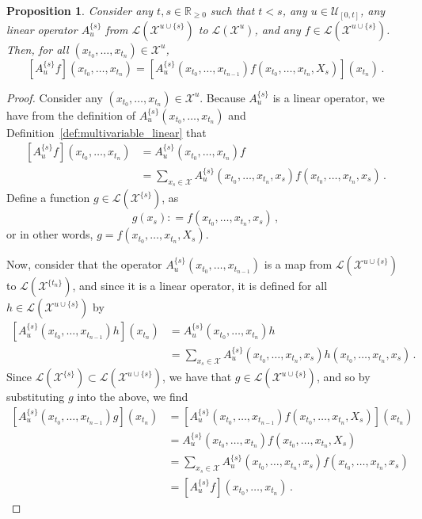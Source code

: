 \documentclass[10pt]{paper}
\newtheorem{proposition}[theorem]{Proposition}
\newcommand{\reals}{\mathbb{R}}
\newcommand{\realsnonneg}{\reals_{\geq 0}}
\newcommand{\states}{\mathcal{X}}
\newcommand{\gambles}{\mathcal{L}}
\newcommand{\coloneqq}{:\!=}
\begin{document}
\begin{proposition}\label{prop:full_history_to_partial_history}
Consider any $t,s\in\realsnonneg$ such that $t<s$, any $u\in\mathcal{U}_{[0,t]}$, any linear operator $A_u^{\{s\}}$ from $\gambles(\states^{u\cup\{s\}})$ to $\gambles(\states^u)$, and any $f\in\gambles(\states^{u\cup\{s\}})$. Then, for all $(x_{t_0},\ldots,x_{t_n})\in\states^u$,
\begin{equation*}
\left[A_u^{\{s\}}f\right](x_{t_0},\ldots,x_{t_n}) = \left[A_u^{\{s\}}(x_{t_0},\ldots,x_{t_{n-1}})f(x_{t_0},\ldots,x_{t_n},X_s)\right](x_{t_n})\,.
\end{equation*}
\end{proposition}
\begin{proof}
Consider any $(x_{t_0},\ldots,x_{t_n})\in\states^u$. Because $A_u^{\{s\}}$ is a linear operator, we have from the definition of $A_u^{\{s\}}(x_{t_0},\ldots,x_{t_n})$ and Definition~\ref{def:multivariable_linear} that
\begin{align*}
\left[A_u^{\{s\}}f\right](x_{t_0},\ldots,x_{t_n}) &= A_u^{\{s\}}(x_{t_0},\ldots,x_{t_n})f \\
 &= \sum_{x_s\in\states} A_u^{\{s\}}(x_{t_0},\ldots,x_{t_n},x_s)f(x_{t_0},\ldots,x_{t_n},x_s)\,.
\end{align*}
Define a function $g\in\gambles(\states^{\{s\}})$, as
\begin{equation*}
g(x_s) \coloneqq f(x_{t_0},\ldots,x_{t_n},x_s)\,,
\end{equation*}
or in other words, $g = f(x_{t_0},\ldots,x_{t_n},X_s)$.

Now, consider that the operator $A_u^{\{s\}}(x_{t_0},\ldots,x_{t_{n-1}})$ is a map from $\gambles(\states^{u\cup\{s\}})$ to $\gambles(\states^{\{t_n\}})$, and since it is a linear operator, it is defined for all $h\in\gambles(\states^{u\cup\{s\}})$ by
\begin{align*}
\left[A_u^{\{s\}}(x_{t_0},\ldots,x_{t_{n-1}})h\right](x_{t_n}) &= A_u^{\{s\}}(x_{t_0},\ldots,x_{t_{n}})h \\
 &= \sum_{x_s\in\states} A_u^{\{s\}}(x_{t_0},\ldots,x_{t_n},x_s)h(x_{t_0},\ldots,x_{t_n},x_s)\,.
\end{align*}
Since $\gambles(\states^{\{s\}})\subset\gambles(\states^{u\cup\{s\}})$, we have that $g\in\gambles(\states^{u\cup\{s\}})$, and so by substituting $g$ into the above, we find
\begin{align*}
\left[A_u^{\{s\}}(x_{t_0},\ldots,x_{t_{n-1}})g\right](x_{t_n}) &= \left[A_u^{\{s\}}(x_{t_0},\ldots,x_{t_{n-1}})f(x_{t_0},\ldots,x_{t_n},X_s)\right](x_{t_n}) \\
 &= A_u^{\{s\}}(x_{t_0},\ldots,x_{t_{n}})f(x_{t_0},\ldots,x_{t_n},X_s)\\
&= \sum_{x_s\in\states} A_u^{\{s\}}(x_{t_0},\ldots,x_{t_n},x_s) f(x_{t_0},\ldots,x_{t_n},x_s) \\
&= \left[A_u^{\{s\}}f\right](x_{t_0},\ldots,x_{t_n})\,.
\end{align*}
\end{proof}
\end{document}
